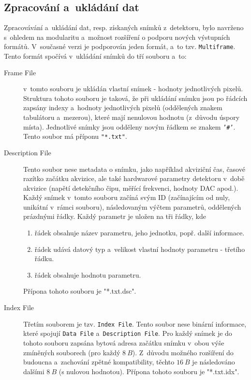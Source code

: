 \subsection{Zpracování a~ukládání dat}\label{atlas:cont:output}
Zpracovávání a~ukládání dat, resp. získaných snímků z~detektoru, bylo navrženo s~ohledem na modularitu a~možnost rozšíření o podporu nových výstupních formátů. V~současné verzi je podporován jeden formát, a~to tzv. \texttt{Multiframe}. Tento formát spočívá v~ukládání snímků do tří souboru a~to:
\begin{description}
	\item[Frame File] v~tomto souboru je ukládán vlastní snímek - hodnoty jednotlivých pixelů. Struktura tohoto souboru je taková, že při ukládání snímku jsou po řádcích zapsány indexy a~hodnoty jednotlivých pixelů (oddělených znakem tabulátoru a~mezerou), které mají nenulovou hodnotu (z~důvodu úspory místa). Jednotlivé snímky jsou odděleny novým řádkem se znakem \texttt{'\#'}. Tento soubor má příponu \texttt{"*.txt"}.
	\item[Description File] Tento soubor nese metadata o snímku, jako například akviziční čas, časové razítko začátku akvizice, ale také hardwarové parametry detektoru v~době akvizice (napětí detekčního čipu, měřící frekvenci, hodnoty DAC apod.). Každý snímek v~tomto souboru začíná svým ID (začínajícím od nuly, unikátní v~rámci souboru), následovaným výčtem parametrů, oddělených prázdnými řádky. Každý parametr je uložen na tři řádky, kde
		\begin{enumerate}
			\item řádek obsahuje název parametru, jeho jednotku, popř. další informace.
			\item řádek udává datový typ a~velikost vlastní hodnoty parametru - třetího řádku.
			\item řádek obsahuje hodnotu parametru.
		\end{enumerate}
	Přípona tohoto souboru je "*.txt.dsc".
	\item[Index File] Třetím souborem je tzv. \texttt{Index File}. Tento soubor nese binární informace, které spojují \texttt{Data File} a~\texttt{Description File}. Pro každý snímek je do tohoto souboru zapsána bytová adresa začátku snímku v~obou výše zmíněných souborech (pro každý $8~B$). Z~důvodu možného rozšíření do budoucna a~zachování zpětné kompatibility, těchto $16~B$ je následováno dalšími $8~B$ (s nulovou hodnotou). Přípona tohoto souboru je "*.txt.idx".
\end{description}

